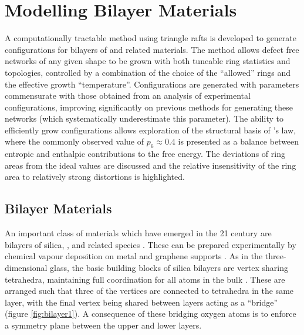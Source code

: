 \chapter[Modelling Bilayer Materials]{Modelling Bilayer Materials}
\label{ch:bilayers}

\begin{chapterabstract}
A computationally tractable \mc{} method using triangle rafts is developed to generate configurations for bilayers of \sioii{} and related materials.
The method allows defect free networks of any given shape to be grown with both tuneable ring statistics and topologies, controlled by a combination of the choice of the ``allowed'' rings and the effective growth ``temperature''. 
Configurations are generated with \aw{} parameters commensurate with those obtained from an analysis of experimental configurations, improving significantly on previous methods for generating these networks (which systematically underestimate this parameter). 
The ability to efficiently grow configurations allows exploration of the structural basis of \lm’s law, where the commonly observed value of $p_6\approx0.4$ is presented as a balance between entropic and enthalpic contributions to the free energy. 
The deviations of ring areas from the ideal values are discussed and the relative insensitivity of the ring area to relatively strong distortions is highlighted.
\end{chapterabstract}

\section{Bilayer Materials}

An important class of \td{} materials which have emerged in the 21\st{} century are bilayers of silica, \sioii, and related species \cite{Buchner2017}.
These can be prepared experimentally by chemical vapour deposition on metal and graphene supports \cite{Huang2012,Lichtenstein2012a}.
As in the three\--dimensional glass, the basic building blocks of silica bilayers are vertex sharing \sioiv{} tetrahedra, maintaining full coordination for all atoms in the bulk \cite{Wilson2013}.
These are arranged such that three of the vertices are connected to tetrahedra in the same layer, with the final vertex being shared between layers acting as a ``bridge'' (figure \ref{fig:bilayer1}).
A consequence of these bridging oxygen atoms is to enforce a symmetry plane between the upper and lower layers. 

